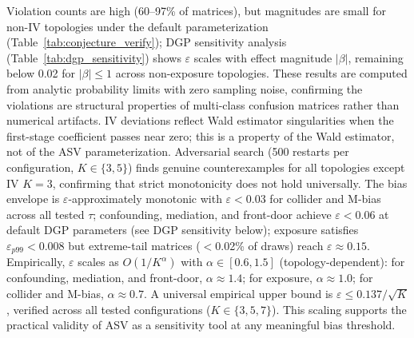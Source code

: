 Violation counts are high (60--97\% of matrices), but magnitudes are small for non-IV topologies under the default parameterization (Table~\ref{tab:conjecture_verify}); DGP sensitivity analysis (Table~\ref{tab:dgp_sensitivity}) shows $\varepsilon$ scales with effect magnitude $|\beta|$, remaining below 0.02 for $|\beta| \leq 1$ across non-exposure topologies. These results are computed from analytic probability limits with zero sampling noise, confirming the violations are structural properties of multi-class confusion matrices rather than numerical artifacts. IV deviations reflect Wald estimator singularities when the first-stage coefficient passes near zero; this is a property of the Wald estimator, not of the ASV parameterization. Adversarial search (500 restarts per configuration, $K \in \{3,5\}$) finds genuine counterexamples for all topologies except IV $K{=}3$, confirming that strict monotonicity does not hold universally. The bias envelope is $\varepsilon$-approximately monotonic with $\varepsilon < 0.03$ for collider and M-bias across all tested $\tau$; confounding, mediation, and front-door achieve $\varepsilon < 0.06$ at default DGP parameters (see DGP sensitivity below); exposure satisfies $\varepsilon_{p99} < 0.008$ but extreme-tail matrices ($<$0.02\% of draws) reach $\varepsilon \approx 0.15$. Empirically, $\varepsilon$ scales as $O(1/K^\alpha)$ with $\alpha \in [0.6, 1.5]$ (topology-dependent): for confounding, mediation, and front-door, $\alpha \approx 1.4$; for exposure, $\alpha \approx 1.0$; for collider and M-bias, $\alpha \approx 0.7$. A universal empirical upper bound is $\varepsilon \leq 0.137/\sqrt{K}$, verified across all tested configurations ($K \in \{3,5,7\}$). This scaling supports the practical validity of ASV as a sensitivity tool at any meaningful bias threshold.

